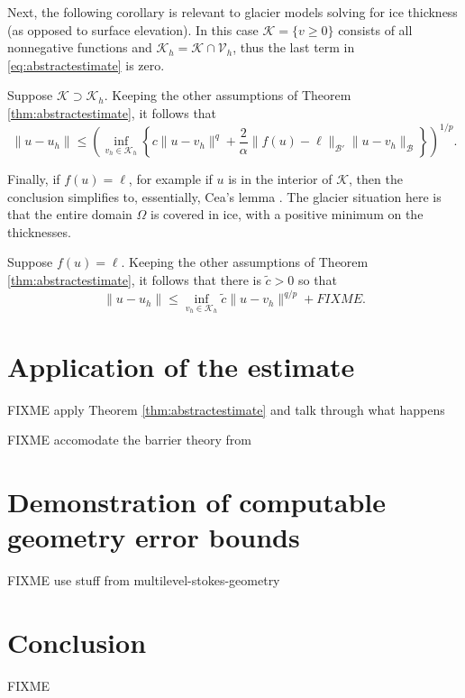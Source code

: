 \documentclass[hidelinks,onefignum,onetabnum,final]{siamart220329}  %
\newcommand{\cB}{\mathcal{B}}
\newcommand{\cK}{\mathcal{K}}
\newcommand{\cV}{\mathcal{V}}
\begin{document}
Next, the following corollary is relevant to glacier models solving for ice thickness (as opposed to surface elevation).  In this case $\cK = \{v\ge 0\}$ consists of all nonnegative functions and $\cK_h=\cK\cap\cV_h$, thus the last term in \eqref{eq:abstractestimate} is zero.

\begin{corollary}  \label{cor:abstractestimate:equalsets}
Suppose $\cK \supset \cK_h$.  Keeping the other assumptions of Theorem \ref{thm:abstractestimate}, it follows that
\begin{equation}
\|u-u_h\| \le \left(\inf_{v_h\in\cK_h} \left\{c \|u - v_h\|^q + \frac{2}{\alpha} \|f(u)-\ell\|_{\cB'} \|u-v_h\|_{\cB}\right\}\right)^{1/p}. \label{eq:abstractestimate:equalsets}
\end{equation}
\end{corollary}

Finally, if $f(u)=\ell$, for example if $u$ is in the interior of $\cK$, then the conclusion simplifies to, essentially, Cea's lemma \cite{Ciarlet2002}.  The glacier situation here is that the entire domain $\Omega$ is covered in ice, with a positive minimum on the thicknesses.

\begin{corollary}  \label{cor:abstractestimate:interior}
Suppose $f(u)=\ell$.  Keeping the other assumptions of Theorem \ref{thm:abstractestimate}, it follows that there is $\tilde c>0$ so that
\begin{equation}
\|u-u_h\| \le \inf_{v_h\in\cK_h} \tilde c \|u - v_h\|^{q/p} + FIXME. \label{eq:abstractestimate:interior}
\end{equation}
\end{corollary}


\section{Application of the estimate} \label{sec:application}

FIXME apply Theorem \ref{thm:abstractestimate} and talk through what happens

FIXME accomodate the barrier theory from \cite{Bueler2021conservation}


\section{Demonstration of computable geometry error bounds} \label{sec:demo}

FIXME use stuff from multilevel-stokes-geometry


\section{Conclusion} \label{sec:conclusion}

FIXME




\end{document}
